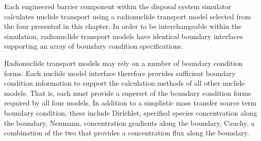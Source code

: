 Each engineered barrier component within the \Cyder disposal system simulator calculates 
nuclide transport using a radionuclide transport model selected from the four presented in this 
chapter. In order to be interchangeable within the simulation, radionuclide 
transport models have identical boundary interfaces supporting an array of 
boundary condition specifications. 

Radionuclide transport models may rely on a number of boundary condition forms.  
Each nuclide model interface therefore provides sufficient boundary condition 
information to support the calculation methods of all other nuclide models. That 
is, each must provide a superset of the boundary condition forms required by all 
four models. In addition to a simplistic mass transfer source term boundary 
condition, these include Dirichlet, specified species concentration along the 
boundary, Neumann, concentration gradients along the boundary, Cauchy, a 
combination of the two that provides a concentration flux along the boundary.
